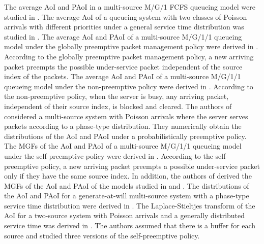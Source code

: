 The average AoI and PAoI in a multi-source M/G/1 FCFS queueing model were studied in    
\cite{9099557,inoue2024exact}.
The average AoI of a queueing system with two classes of Poisson arrivals with different priorities under a general service time distribution was studied in \cite{8886357}. 
The average AoI and PAoI of a multi-source M/G/1/1 queueing model under the globally preemptive packet management policy were derived in \cite{8406928}.  According to the globally preemptive packet management policy, a new arriving packet preempts the possible under-service packet independent of the source index of the packets.
The average AoI and PAoI of a multi-source M/G/1/1 queueing model under the non-preemptive policy were derived in \cite{9500775}. According to the non-preemptive policy, when the server is busy, any arriving packet, independent of their source index, is blocked and cleared.  
 The authors of \cite{9519697} considered a multi-source system with Poisson arrivals where the server serves packets according to a phase-type distribution. 
 They numerically obtain the distributions of the AoI and PAoI under a probabilistically preemptive policy. 
The MGFs of the AoI and PAoI of a multi-source M/G/1/1 queueing model under the self-preemptive policy were derived in \cite{9869867}. According to the self-preemptive policy, a new arriving packet preempts a possible under-service packet only if they have the same source index. In addition, the authors of \cite{9869867} derived the MGFs of the AoI and PAoI of the models studied in \cite{9500775} and \cite{9869867}.
The distributions of the AoI and PAoI for a generate-at-will multi-source system with a phase-type service time distribution were derived in \cite{10139823}.
The Laplace-Stieltjes transform of the AoI for a two-source system with Poisson arrivals and a generally distributed service time was derived in \cite{10038591}. The authors assumed that there is a buffer for each source and studied three versions of the self-preemptive policy. 





%
